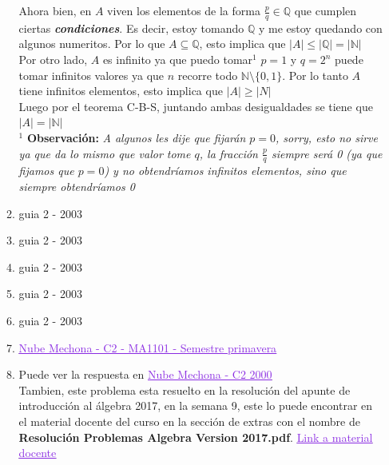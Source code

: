 \documentclass[letterpaper,12pt]{article}
\newcommand{\Q}{\mathbb Q}
\newcommand{\N}{\mathbb N}
\theoremstyle{plain}
\begin{document}
\begin{enumerate}[a)]
\begin{enumerate}[\bf P1.]
        Ahora bien, en $A$ viven los elementos de la forma $\frac{p}{q} \in \Q$ que cumplen ciertas \textit{\textbf{condiciones}}. Es decir, estoy tomando $\Q$ y me estoy quedando con algunos numeritos. Por lo que $A\subseteq \Q$, esto implica que $|A|\leq |\Q|=|\N|$\\
        
        Por otro lado, $A$ es infinito ya que puedo tomar$^{1}$ $p=1$ y $q=2^{n}$ puede tomar infinitos valores ya que $n$ recorre todo $\N \setminus \{0,1\}$. Por lo tanto $A$ tiene infinitos elementos, esto implica que $|A|\geq|N|$\\
        
        Luego por el teorema C-B-S, juntando ambas desigualdades se tiene que $|A|=|\N|$\\
        
        $\phantom{}^1$ \textbf{Observación:} \textit{A algunos les dije que fijarán $p=0$, sorry, esto no sirve ya que da lo mismo que valor tome $q$, la fracción $\frac{p}{q}$ siempre será 0 (ya que fijamos que $p=0$) y no obtendríamos infinitos elementos, sino que siempre obtendríamos 0}\\
        
        \item guia 2 - 2003 
        \item guia 2 - 2003 
        \item guia 2 - 2003 
        \item guia 2 - 2003 
        \item guia 2 - 2003\\
        
        \item \href{https://drive.google.com/drive/folders/0BxGtZFcrPtd5SnU1Z2JZQTQwOE0}{\textcolor{BlueViolet}{\underline{Nube Mechona - C2 - MA1101 - Semestre primavera}}}\\
        
        
        \item Puede ver la respuesta en \href{https://drive.google.com/drive/folders/0B2BWTqIXpSJsakxLVUNxejQyc1U}{\textcolor{BlueViolet}{\underline{Nube Mechona - C2 2000}}}\\
        
        Tambien, este problema esta resuelto en la resolución del apunte de introducción al álgebra 2017, en la semana 9, este lo puede encontrar en el material docente del curso en la sección de extras con el nombre de \textbf{Resolución Problemas Algebra Version 2017.pdf}. \href{https://www.u-cursos.cl/ingenieria/2017/1/MA1101/1/material_docente/}{\textcolor{BlueViolet}{\underline{Link a material docente}}}\\
        

\end{enumerate}
\end{enumerate}
\end{document}
